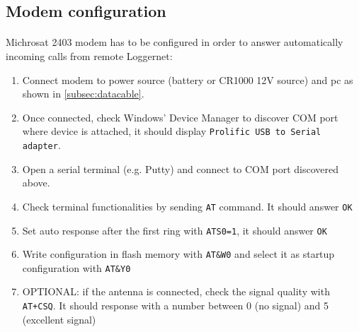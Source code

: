 \subsection{Modem configuration}
\paragraph{} Michrosat 2403 modem has to be configured in order to answer automatically incoming calls from remote Loggernet:
\begin{enumerate}
	\item Connect modem to power source (battery or CR1000 12V source) and pc as shown in \ref{subsec:datacable}.
	\item Once connected, check Windows' Device Manager to discover COM port where device is attached, it should display {\tt Prolific USB to Serial adapter}.
	\item Open a serial terminal (e.g. Putty) and connect to COM port discovered above.
	\item Check terminal functionalities by sending {\tt AT} command. It should answer {\tt OK}
	\item Set auto response after the first ring with {\tt ATS0=1}, it should answer {\tt OK}
	\item Write configuration in flash memory with {\tt AT\&W0} and select it as startup configuration with {\tt AT\&Y0}
	\item OPTIONAL: if the antenna is connected, check the signal quality with {\tt AT+CSQ}. It should response with a number between 0 (no signal) and 5 (excellent signal)
\end{enumerate}